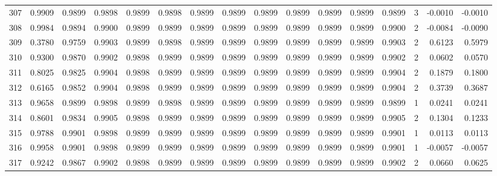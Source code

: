 \begin{tabular}{lrrrrrrrrrrrrrrr}
307 &      0.9909 &  0.9899 &  0.9898 &  0.9899 &  0.9898 &  0.9899 &  0.9899 &  0.9899 &  0.9899 &  0.9899 &   0.9899 &     0.9899 &      3 &                   -0.0010 &                    -0.0010 \\
308 &      0.9984 &  0.9894 &  0.9900 &  0.9899 &  0.9899 &  0.9899 &  0.9899 &  0.9899 &  0.9899 &  0.9899 &   0.9899 &     0.9900 &      2 &                   -0.0084 &                    -0.0090 \\
309 &      0.3780 &  0.9759 &  0.9903 &  0.9899 &  0.9898 &  0.9899 &  0.9899 &  0.9899 &  0.9899 &  0.9899 &   0.9899 &     0.9903 &      2 &                    0.6123 &                     0.5979 \\
310 &      0.9300 &  0.9870 &  0.9902 &  0.9898 &  0.9899 &  0.9899 &  0.9899 &  0.9899 &  0.9899 &  0.9899 &   0.9899 &     0.9902 &      2 &                    0.0602 &                     0.0570 \\
311 &      0.8025 &  0.9825 &  0.9904 &  0.9898 &  0.9899 &  0.9899 &  0.9899 &  0.9899 &  0.9899 &  0.9899 &   0.9899 &     0.9904 &      2 &                    0.1879 &                     0.1800 \\
312 &      0.6165 &  0.9852 &  0.9904 &  0.9898 &  0.9899 &  0.9899 &  0.9899 &  0.9899 &  0.9899 &  0.9899 &   0.9899 &     0.9904 &      2 &                    0.3739 &                     0.3687 \\
313 &      0.9658 &  0.9899 &  0.9898 &  0.9899 &  0.9898 &  0.9899 &  0.9899 &  0.9899 &  0.9899 &  0.9899 &   0.9899 &     0.9899 &      1 &                    0.0241 &                     0.0241 \\
314 &      0.8601 &  0.9834 &  0.9905 &  0.9898 &  0.9899 &  0.9899 &  0.9899 &  0.9899 &  0.9899 &  0.9899 &   0.9899 &     0.9905 &      2 &                    0.1304 &                     0.1233 \\
315 &      0.9788 &  0.9901 &  0.9898 &  0.9899 &  0.9899 &  0.9899 &  0.9899 &  0.9899 &  0.9899 &  0.9899 &   0.9899 &     0.9901 &      1 &                    0.0113 &                     0.0113 \\
316 &      0.9958 &  0.9901 &  0.9898 &  0.9899 &  0.9899 &  0.9899 &  0.9899 &  0.9899 &  0.9899 &  0.9899 &   0.9899 &     0.9901 &      1 &                   -0.0057 &                    -0.0057 \\
317 &      0.9242 &  0.9867 &  0.9902 &  0.9898 &  0.9899 &  0.9899 &  0.9899 &  0.9899 &  0.9899 &  0.9899 &   0.9899 &     0.9902 &      2 &                    0.0660 &                     0.0625 \\

\end{tabular}

